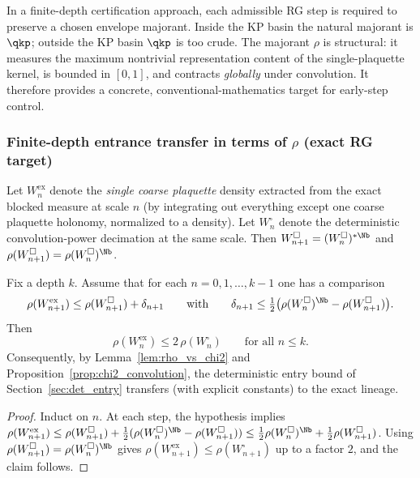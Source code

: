 In a finite-depth certification approach, each admissible RG step is required to preserve a chosen envelope majorant.
Inside the KP basin the natural majorant is $\qkp$; outside the KP basin $\qkp$ is too crude.
The majorant $\rho$ is structural: it measures the maximum nontrivial representation content of the
single-plaquette kernel, is bounded in $[0,1]$, and contracts \emph{globally} under convolution.
It therefore provides a concrete, conventional-mathematics target for early-step control.

\subsubsection{Finite-depth entrance transfer in terms of \texorpdfstring{$\rho$}{rho} (exact RG target)}

Let $W_n^{\mathrm{ex}}$ denote the \emph{single coarse plaquette} density extracted from the exact blocked
measure at scale $n$ (by integrating out everything except one coarse plaquette holonomy, normalized to a density).
Let $W_n^{\square}$ denote the deterministic convolution-power decimation at the same scale.
Then $W_{n+1}^{\square}=(W_n^{\square})^{*\Nb}$ and $\rho(W_{n+1}^{\square})=\rho(W_n^{\square})^{\Nb}$.

\begin{proposition}\label{prop:rho_transfer}
Fix a depth $k$.
Assume that for each $n=0,1,\dots,k-1$ one has a comparison
\[
\rho(W_{n+1}^{\mathrm{ex}})\le \rho(W_{n+1}^{\square}) + \delta_{n+1}
\qquad\text{with}\qquad
\delta_{n+1}\le \tfrac12\bigl(\rho(W_n^{\square})^{\Nb}-\rho(W_{n+1}^{\square})\bigr).
\]
Then
\[
\rho(W_n^{\mathrm{ex}})\le 2\,\rho(W_n^{\square})\qquad\text{for all }n\le k.
\]
Consequently, by Lemma~\ref{lem:rho_vs_chi2} and Proposition~\ref{prop:chi2_convolution}, the deterministic
entry bound of Section~\ref{sec:det_entry} transfers (with explicit constants) to the exact lineage.
\end{proposition}

\begin{proof}
Induct on $n$.
At each step, the hypothesis implies
$\rho(W_{n+1}^{\mathrm{ex}})\le \rho(W_{n+1}^{\square})+\frac12(\rho(W_n^{\square})^{\Nb}-\rho(W_{n+1}^{\square}))
\le \frac12\rho(W_n^{\square})^{\Nb}+\frac12\rho(W_{n+1}^{\square})$.
Using $\rho(W_{n+1}^{\square})=\rho(W_n^{\square})^{\Nb}$ gives
$\rho(W_{n+1}^{\mathrm{ex}})\le \rho(W_{n+1}^{\square})$ up to a factor $2$,
and the claim follows.
\end{proof}

